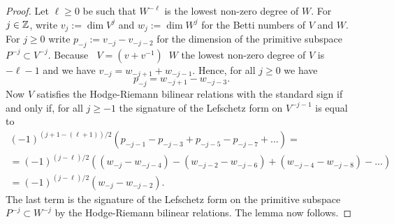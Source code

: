 \documentclass[11pt]{amsart}
\numberwithin{equation}{section}
\def\un{\underline}
\theoremstyle{definition}
\theoremstyle{remark}
\DeclareMathOperator{\gdim}{\un{\dim}}
\begin{document}
\begin{proof} Let $\ell \ge 0$ be such that $W^{-\ell}$ is the lowest
  non-zero degree of $W$. For $j \in {\mathbb{Z}}$, write $v_j := \dim V^j$ and
  $w_j := \dim W^j$ for the Betti numbers of $V$ and $W$. For $j \ge
  0$ write $p_{-j} := v_{-j} - v_{-j-2}$ for the dimension of the
  primitive subspace $P^{-j} \subset V^{-j}$. Because  $\gdim V =
  (v+v^{-1}) \gdim W$ the lowest non-zero degree of $V$ is $-\ell - 1$
  and we have $v_{-j} = w_{-j + 1} + w_{-j-1}$. Hence, for all $j \ge 0$ we have
\[
p_{-j} = w_{-j+1}-w_{-j-3}.
\]
Now $V$ satisfies the
  Hodge-Riemann bilinear relations with the standard sign 
if and only if, for all $j \ge -1$
  the signature of the Lefschetz form on $V^{-j-1}$ is equal to
\begin{gather*}
(-1)^{(j+1-(\ell+1))/2}(p_{-j-1} - p_{-j-3} + p_{-j-5} - p_{-j-7} +
\dots ) = \\
= (-1)^{(j-\ell)/2}( (w_{-j} - w_{-j-4}) -  (w_{-j-2} - w_{-j-6}) +
(w_{-j-4} - w_{-j-8}) - \dots  )\\
= (-1)^{(j-\ell)/2}(w_{-j} - w_{-j-2}).
\end{gather*}
The last term is the signature of the Lefschetz form on the
primitive subspace $P^{-j} \subset W^{-j}$ by the Hodge-Riemann
bilinear relations. The lemma now follows.
\end{proof}

\end{document}
